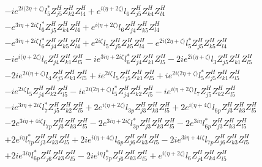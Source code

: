 \begin{align}
 &-i e^{2 i \Big(2 \eta +\zeta \Big)} l_5^* Z_{{j 5}}^{H} Z_{{k 2}}^{H} Z_{{l 4}}^{H} +e^{i \Big(\eta +2 \zeta \Big)} l_6 Z_{{j 5}}^{H} Z_{{k 4}}^{H} Z_{{l 4}}^{H} \nonumber \\ 
 &- e^{3 i \eta +2 i \zeta } l_6^* Z_{{j 5}}^{H} Z_{{k 4}}^{H} Z_{{l 4}}^{H} +e^{i \Big(\eta +2 \zeta \Big)} l_6 Z_{{j 4}}^{H} Z_{{k 5}}^{H} Z_{{l 4}}^{H} \nonumber \\ 
 &- e^{3 i \eta +2 i \zeta } l_6^* Z_{{j 4}}^{H} Z_{{k 5}}^{H} Z_{{l 4}}^{H} +e^{2 i \zeta } l_5 Z_{{j 5}}^{H} Z_{{k 5}}^{H} Z_{{l 4}}^{H} - e^{2 i \Big(2 \eta +\zeta \Big)} l_5^* Z_{{j 5}}^{H} Z_{{k 5}}^{H} Z_{{l 4}}^{H} \nonumber \\ 
 &-i e^{i \Big(\eta +2 \zeta \Big)} l_6 Z_{{j 4}}^{H} Z_{{k 1}}^{H} Z_{{l 5}}^{H} -i e^{3 i \eta +2 i \zeta } l_6^* Z_{{j 4}}^{H} Z_{{k 1}}^{H} Z_{{l 5}}^{H} -2 i e^{2 i \Big(\eta +\zeta \Big)} l_3 Z_{{j 5}}^{H} Z_{{k 1}}^{H} Z_{{l 5}}^{H} \nonumber \\ 
 &-2 i e^{2 i \Big(\eta +\zeta \Big)} l_4 Z_{{j 5}}^{H} Z_{{k 1}}^{H} Z_{{l 5}}^{H} +i e^{2 i \zeta } l_5 Z_{{j 5}}^{H} Z_{{k 1}}^{H} Z_{{l 5}}^{H} +i e^{2 i \Big(2 \eta +\zeta \Big)} l_5^* Z_{{j 5}}^{H} Z_{{k 1}}^{H} Z_{{l 5}}^{H} \nonumber \\ 
 &-i e^{2 i \zeta } l_5 Z_{{j 4}}^{H} Z_{{k 2}}^{H} Z_{{l 5}}^{H} -i e^{2 i \Big(2 \eta +\zeta \Big)} l_5^* Z_{{j 4}}^{H} Z_{{k 2}}^{H} Z_{{l 5}}^{H} -i e^{i \Big(\eta +2 \zeta \Big)} l_7 Z_{{j 5}}^{H} Z_{{k 2}}^{H} Z_{{l 5}}^{H} \nonumber \\ 
 &-i e^{3 i \eta +2 i \zeta } l_7^* Z_{{j 5}}^{H} Z_{{k 2}}^{H} Z_{{l 5}}^{H} +2 e^{i \Big(\eta +2 \zeta \Big)} l_{3p} Z_{{j 3}}^{H} Z_{{k 3}}^{H} Z_{{l 5}}^{H} +2 e^{i \Big(\eta +4 \zeta \Big)} l_{6p} Z_{{j 3}}^{H} Z_{{k 3}}^{H} Z_{{l 5}}^{H} \nonumber \\ 
 &-2 e^{3 i \eta +4 i \zeta } l_{7p} Z_{{j 3}}^{H} Z_{{k 3}}^{H} Z_{{l 5}}^{H} -2 e^{3 i \eta +2 i \zeta } l_{3p}^* Z_{{j 3}}^{H} Z_{{k 3}}^{H} Z_{{l 5}}^{H} -2 e^{3 i \eta } l_{6p}^* Z_{{j 3}}^{H} Z_{{k 3}}^{H} Z_{{l 5}}^{H} \nonumber \\ 
 &+2 e^{i \eta } l_{7p}^* Z_{{j 3}}^{H} Z_{{k 3}}^{H} Z_{{l 5}}^{H} +2 i e^{i \Big(\eta +4 \zeta \Big)} l_{6p} Z_{{j 6}}^{H} Z_{{k 3}}^{H} Z_{{l 5}}^{H} -2 i e^{3 i \eta +4 i \zeta } l_{7p} Z_{{j 6}}^{H} Z_{{k 3}}^{H} Z_{{l 5}}^{H} \nonumber \\ 
 &+2 i e^{3 i \eta } l_{6p}^* Z_{{j 6}}^{H} Z_{{k 3}}^{H} Z_{{l 5}}^{H} -2 i e^{i \eta } l_{7p}^* Z_{{j 6}}^{H} Z_{{k 3}}^{H} Z_{{l 5}}^{H} +e^{i \Big(\eta +2 \zeta \Big)} l_6 Z_{{j 4}}^{H} Z_{{k 4}}^{H} Z_{{l 5}}^{H} \nonumber \\ 

\end{align}
